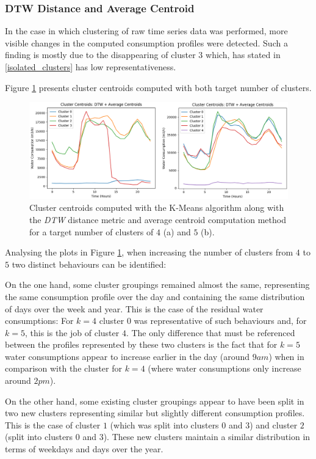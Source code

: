\documentclass[9pt,journal,compsoc]{IEEEtran}
\begin{document}
\subsubsection{DTW Distance and Average Centroid}

In the case in which clustering of raw time series data was performed, more visible changes in the computed consumption profiles were detected. Such a finding is mostly due to the disappearing of cluster $3$ which, has stated in \ref{isolated_clusters} has low representativeness.

Figure \ref{comparison_clusters_45_dtw} presents cluster centroids computed with both target number of clusters.

\begin{figure}
	\centering
	\includegraphics[scale=0.4]{images/centroids_45_clusters_dtw.png}
	\caption{Cluster centroids computed with the K-Means algorithm along with the \emph{DTW} distance metric and average centroid computation method for a target number of clusters of $4$ (a) and $5$ (b).}
	\label{comparison_clusters_45_dtw}
\end{figure}

Analysing the plots in Figure \ref{comparison_clusters_45_dtw}, when increasing the number of clusters from $4$ to $5$ two distinct behaviours can be identified:

On the one hand, some cluster groupings remained almost the same, representing the same consumption profile over the day and containing the same distribution of days over the week and year. This is the case of the residual water consumptions: For $k=4$ cluster $0$ was representative of such behaviours and, for $k=5$, this is the job of cluster $4$. The only difference that must be referenced between the profiles represented by these two clusters is the fact that for $k=5$ water consumptions appear to increase earlier in the day (around $9am$) when in comparison with the cluster for $k=4$ (where water consumptions only increase around $2pm$).

On the other hand, some existing cluster groupings appear to have been split in two new clusters representing similar but slightly different consumption profiles. This is the case of cluster $1$ (which was split into clusters $0$ and $3$) and cluster $2$ (split into clusters $0$ and $3$). These new clusters maintain a similar distribution in terms of weekdays and days over the year.
\end{document}
